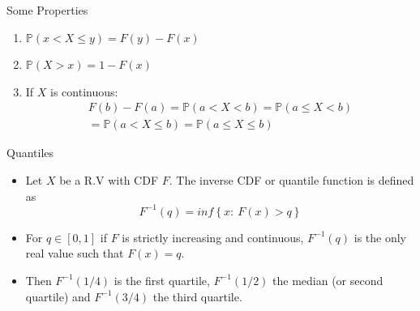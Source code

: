 \documentclass[handout]{beamer}
\begin{document}
\begin{frame}{Some Properties}

\begin{enumerate}
 \item $ \mathbb{P}( x < X \leq y) = F(y) - F(x)$
       

\item $ \mathbb{P}(X > x) = 1 - F(x)$ 

\item If $X$ is continuous: 
\begin{eqnarray*}
 F(b) - F(a) = \mathbb{P}(a < X < b) = \mathbb{P} ( a \leq X < b)  \\
   = \mathbb{P} ( a < X \leq b) = \mathbb{P} ( a \leq X \leq b) 
\end{eqnarray*}

\end{enumerate}



 
\end{frame}





\begin{frame}{Quantiles}
\scriptsize{
\begin{itemize}
 \item Let $X$ be a R.V with CDF $F$. The inverse CDF or quantile function is defined as \begin{displaymath}
                                                                                   F^{-1}(q)= inf \left\{ x: \ F(x) > q \right\}
                                                                                     \end{displaymath}
 \item For $q \in [0,1]$ if $F$ is strictly increasing and continuous, $F^{-1}(q)$ is the only real value such that $F(x)=q$.
 \item Then $F^{-1}(1/4)$ is the first quartile, $F^{-1}(1/2)$ the median (or second quartile) and $F^{-1}(3/4)$ the third quartile.
 
 
\end{itemize}

}

\end{frame}
\end{document}
